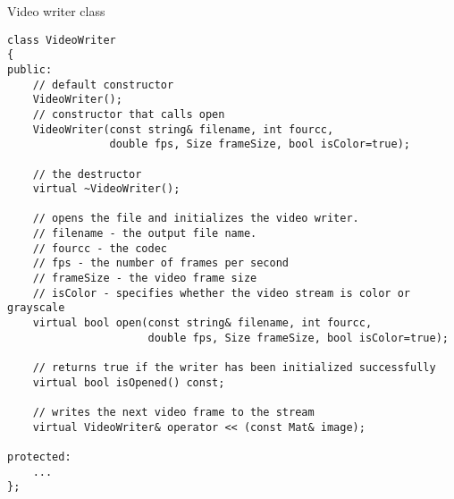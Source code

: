 Video writer class

\begin{lstlisting}
class VideoWriter
{
public:    
    // default constructor
    VideoWriter();
    // constructor that calls open
    VideoWriter(const string& filename, int fourcc,
                double fps, Size frameSize, bool isColor=true);
    
    // the destructor
    virtual ~VideoWriter();
    
    // opens the file and initializes the video writer.
    // filename - the output file name. 
    // fourcc - the codec
    // fps - the number of frames per second
    // frameSize - the video frame size
    // isColor - specifies whether the video stream is color or grayscale
    virtual bool open(const string& filename, int fourcc,
                      double fps, Size frameSize, bool isColor=true);
    
    // returns true if the writer has been initialized successfully
    virtual bool isOpened() const;
    
    // writes the next video frame to the stream
    virtual VideoWriter& operator << (const Mat& image);
    
protected:
    ...
};
\end{lstlisting}

\fi

